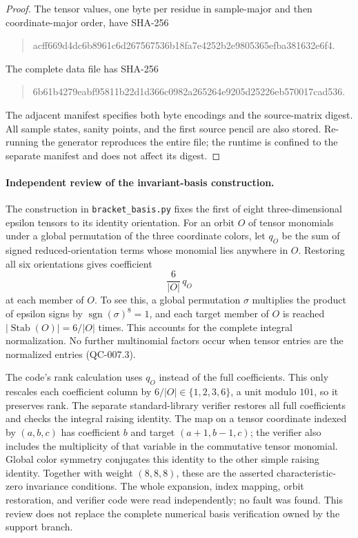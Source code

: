 \begin{proof}
The tensor values, one byte per residue in sample-major and
then coordinate-major order, have SHA-256
\begin{quote}\ttfamily\small
acff669d4dc6b8961c6d267567536b18fa7e4252b2e9805365efba381632e6f4.
\end{quote}
The complete data file has SHA-256
\begin{quote}\ttfamily\small
6b61b4279eabf95811b22d1d366c0982a265264e9205d25226eb570017cad536.
\end{quote}
The adjacent manifest specifies both byte encodings and the
source-matrix digest. All sample states, sanity points, and
the first source pencil are also stored. Re-running the
generator reproduces the entire file; the runtime is confined
to the separate manifest and does not affect its digest.
\end{proof}

\paragraph{Independent review of the invariant-basis construction.}
The construction in \texttt{bracket\_basis.py} fixes the first
of eight three-dimensional epsilon tensors to its identity
orientation. For an orbit $O$ of tensor monomials under a
global permutation of the three coordinate colors, let $q_O$
be the sum of signed reduced-orientation terms whose monomial
lies anywhere in $O$. Restoring all six orientations gives
coefficient
\[
 \frac{6}{|O|}\,q_O
 \tag{QC-007.6}
\]
at each member of $O$. To see this, a global permutation
$\sigma$ multiplies the product of epsilon signs by
$\operatorname{sgn}(\sigma)^8=1$, and each target member of
$O$ is reached $|\operatorname{Stab}(O)|=6/|O|$ times.
This accounts for the complete integral normalization.
No further multinomial factors occur when tensor entries
are the normalized entries (QC-007.3).

The code's rank calculation uses $q_O$ instead of the full
coefficients. This only rescales each coefficient column by
$6/|O|\in\{1,2,3,6\}$, a unit modulo $101$, so it preserves
rank. The separate standard-library verifier restores all
full coefficients and checks the integral raising identity.
The map on a tensor coordinate indexed by $(a,b,c)$ has
coefficient $b$ and target $(a+1,b-1,c)$; the verifier
also includes the multiplicity of that variable in the
commutative tensor monomial. Global color symmetry conjugates
this identity to the other simple raising identity. Together
with weight $(8,8,8)$, these are the asserted characteristic-zero
invariance conditions. The whole expansion, index mapping,
orbit restoration, and verifier code were read independently;
no fault was found. This review does not replace the complete
numerical basis verification owned by the support branch.
